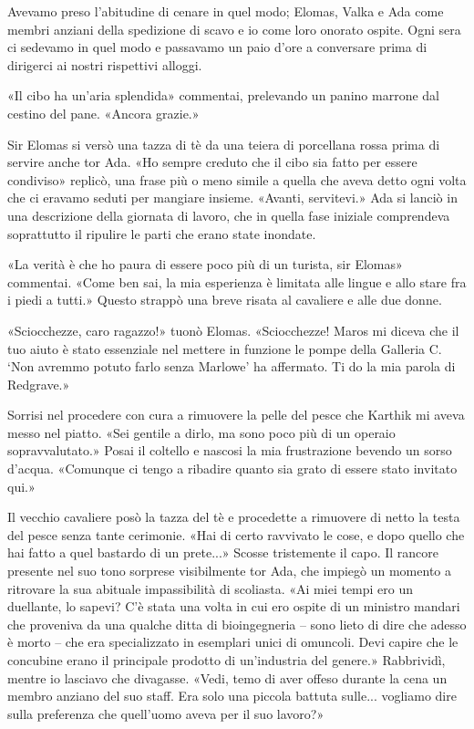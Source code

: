Avevamo preso l'abitudine di cenare in quel modo; Elomas, Valka e Ada
come membri anziani della spedizione di scavo e io come loro onorato
ospite. Ogni sera ci sedevamo in quel modo e passavamo un paio d'ore a
conversare prima di dirigerci ai nostri rispettivi alloggi.

«Il cibo ha un'aria splendida» commentai, prelevando un panino marrone
dal cestino del pane. «Ancora grazie.»

Sir Elomas si versò una tazza di tè da una teiera di porcellana rossa
prima di servire anche tor Ada. «Ho sempre creduto che il cibo sia fatto
per essere condiviso» replicò, una frase più o meno simile a quella che
aveva detto ogni volta che ci eravamo seduti per mangiare insieme.
«Avanti, servitevi.» Ada si lanciò in una descrizione della giornata di
lavoro, che in quella fase iniziale comprendeva soprattutto il ripulire
le parti che erano state inondate.

«La verità è che ho paura di essere poco più di un turista, sir Elomas»
commentai. «Come ben sai, la mia esperienza è limitata alle lingue e
allo stare fra i piedi a tutti.» Questo strappò una breve risata al
cavaliere e alle due donne.

«Sciocchezze, caro ragazzo!» tuonò Elomas. «Sciocchezze! Maros mi diceva
che il tuo aiuto è stato essenziale nel mettere in funzione le pompe
della Galleria C. `Non avremmo potuto farlo senza Marlowe' ha affermato.
Ti do la mia parola di Redgrave.»

Sorrisi nel procedere con cura a rimuovere la pelle del pesce che
Karthik mi aveva messo nel piatto. «Sei gentile a dirlo, ma sono poco
più di un operaio sopravvalutato.» Posai il coltello e nascosi la mia
frustrazione bevendo un sorso d'acqua. «Comunque ci tengo a ribadire
quanto sia grato di essere stato invitato qui.»

Il vecchio cavaliere posò la tazza del tè e procedette a rimuovere di
netto la testa del pesce senza tante cerimonie. «Hai di certo ravvivato
le cose, e dopo quello che hai fatto a quel bastardo di un prete...»
Scosse tristemente il capo. Il rancore presente nel suo tono sorprese
visibilmente tor Ada, che impiegò un momento a ritrovare la sua abituale
impassibilità di scoliasta. «Ai miei tempi ero un duellante, lo sapevi?
C'è stata una volta in cui ero ospite di un ministro mandari che
proveniva da una qualche ditta di bioingegneria -- sono lieto di dire
che adesso è morto -- che era specializzato in esemplari unici di
omuncoli. Devi capire che le concubine erano il principale prodotto di
un'industria del genere.» Rabbrividì, mentre io lasciavo che divagasse.
«Vedi, temo di aver offeso durante la cena un membro anziano del suo
staff. Era solo una piccola battuta sulle... vogliamo dire sulla
preferenza che quell'uomo aveva per il suo lavoro?»


